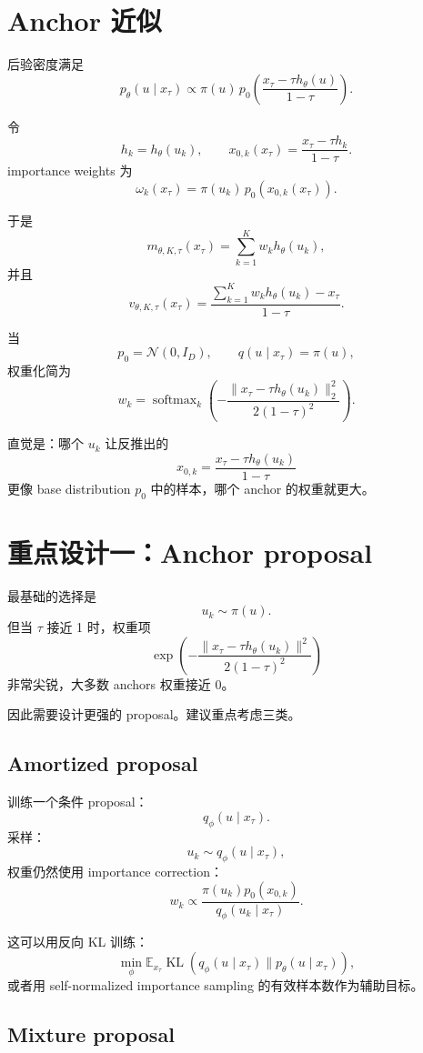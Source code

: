 \documentclass[UTF8,11pt]{ctexart}
\newcommand{\E}{\mathbb{E}}
\newcommand{\cN}{\mathcal{N}}
\newcommand{\softmax}{\operatorname{softmax}}
\newcommand{\KL}{\operatorname{KL}}
\begin{document}
\section{Anchor 近似}

后验密度满足
\[
p_\theta(u\mid x_\tau)
\propto
\pi(u)\,
p_0
\left(
\frac{x_\tau-\tau h_\theta(u)}{1-\tau}
\right).
\]

令
\[
h_k=h_\theta(u_k),
\qquad
x_{0,k}(x_\tau)
=
\frac{x_\tau-\tau h_k}{1-\tau}.
\]
importance weights 为
\[
\omega_k(x_\tau)
=
\pi(u_k)\,
p_0(x_{0,k}(x_\tau)).
\]

于是
\[
m_{\theta,K,\tau}(x_\tau)
=
\sum_{k=1}^K w_kh_\theta(u_k),
\]
并且
\[
v_{\theta,K,\tau}(x_\tau)
=
\frac{
\sum_{k=1}^K w_kh_\theta(u_k)-x_\tau
}{1-\tau}.
\]

当
\[
p_0=\cN(0,I_D),\qquad q(u\mid x_\tau)=\pi(u),
\]
权重化简为
\[
w_k
=
\softmax_k
\left(
-
\frac{
\|x_\tau-\tau h_\theta(u_k)\|_2^2
}{
2(1-\tau)^2
}
\right).
\]

直觉是：哪个 \(u_k\) 让反推出的
\[
x_{0,k}
=
\frac{x_\tau-\tau h_\theta(u_k)}{1-\tau}
\]
更像 base distribution \(p_0\) 中的样本，哪个 anchor 的权重就更大。


\section{重点设计一：Anchor proposal}

最基础的选择是
\[
u_k\sim\pi(u).
\]
但当 \(\tau\) 接近 1 时，权重项
\[
\exp\left(
-
\frac{\|x_\tau-\tau h_\theta(u_k)\|^2}{2(1-\tau)^2}
\right)
\]
非常尖锐，大多数 anchors 权重接近 0。

因此需要设计更强的 proposal。建议重点考虑三类。

\subsection{Amortized proposal}

训练一个条件 proposal：
\[
q_\phi(u\mid x_\tau).
\]
采样：
\[
u_k\sim q_\phi(u\mid x_\tau),
\]
权重仍然使用 importance correction：
\[
w_k\propto
\frac{
\pi(u_k)p_0(x_{0,k})
}{
q_\phi(u_k\mid x_\tau)
}.
\]

这可以用反向 KL 训练：
\[
\min_\phi
\E_{x_\tau}
\KL\left(
q_\phi(u\mid x_\tau)
\|p_\theta(u\mid x_\tau)
\right),
\]
或者用 self-normalized importance sampling 的有效样本数作为辅助目标。

\subsection{Mixture proposal}
\end{document}
